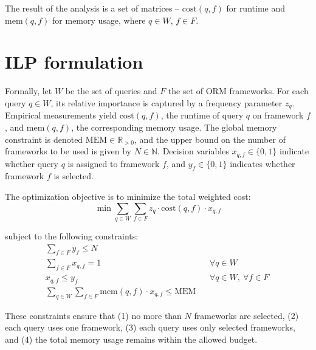 
The result of the analysis is a set of matrices -- $\text{cost}(q,f)$ for runtime and $\text{mem}(q,f)$ for memory usage, where $q \in W$, $f \in F$. %

\section{ILP formulation}

Formally, let $W$ be the set of queries and $F$ the set of ORM frameworks. For each query $q \in W$, its relative importance is captured by a frequency parameter $z_q$. Empirical measurements yield $\text{cost}(q, f)$, the runtime of query $q$ on framework $f$, and $\text{mem}(q, f)$, the corresponding memory usage. The global memory constraint is denoted $\text{MEM} \in \mathbb{R}_{>0}$, and the upper bound on the number of frameworks to be used is given by $N \in \mathbb{N}$. Decision variables $x_{q,f} \in \{0,1\}$ indicate whether query $q$ is assigned to framework $f$, and $y_f \in \{0,1\}$ indicates whether framework $f$ is selected.

The optimization objective is to minimize the total weighted cost:
$$\min \sum_{q \in W} \sum_{f \in F} z_q \cdot \text{cost}(q, f) \cdot x_{q,f}$$

\noindent
subject to the following constraints:
\begin{align}
&\sum_{f \in F} y_f \leq N && \tag{1} \\
&\sum_{f \in F} x_{q,f} = 1 && \forall q \in W \quad \tag{2} \\
&x_{q,f} \leq y_f && \forall q \in W,\ \forall f \in F \quad \tag{3} \\
&\sum_{q \in W} \sum_{f \in F} \text{mem}(q,f) \cdot x_{q,f} \leq \text{MEM} && \tag{4}
\end{align}

These constraints ensure that (1) no more than $N$ frameworks are selected, (2) each query uses one framework, (3) each query uses only selected frameworks, and (4) the total memory usage remains within the allowed budget.

